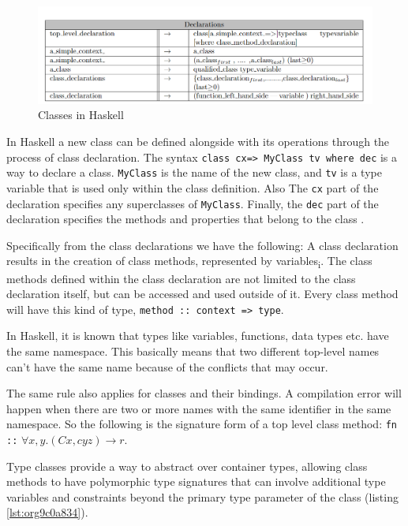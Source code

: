 \documentclass[a4paper, titlepage, twoside]{article}
\begin{document}
\begin{figure}[htbp]
\centering
\includegraphics[width=.9\linewidth]{img/2023-05-25_13-28-35_screenshot.png}
\caption{\label{fig:org0ea80a0}Classes in Haskell}
\end{figure}

In Haskell a new class can be defined alongside with its operations through the process of class declaration. The syntax \texttt{class cx=> MyClass tv where dec} is a way to declare a class. \texttt{MyClass} is the name of the new class, and \texttt{tv} is a type variable that is used only within the class definition. Also The \texttt{cx} part of the declaration specifies any superclasses of \texttt{MyClass}. Finally, the \texttt{dec} part of the declaration specifies the methods and properties that belong to the class \autocite[chapter 4.3]{marlowHaskell2010Language2010}.

Specifically from the class declarations we have the following: A class declaration results in the creation of class methods, represented by variables\textsubscript{i}. The class methods defined within the class declaration are not limited to the class declaration itself, but can be accessed and used outside of it. Every class method will have this kind of type, \texttt{method :: context => type}.

In Haskell, it is known that types like variables, functions, data types etc. have the same namespace. This basically means that two different top-level names can't have the same name because of the conflicts that may occur.

The same rule also applies for classes and their bindings. A compilation error will happen when there are two or more names with the same identifier in the same namespace. So the following is the signature form of a top level class method: \texttt{fn ::} \(\forall x, y. (Cx, cyz) \rightarrow r\).

Type classes provide a way to abstract over container types, allowing class methods to have polymorphic type signatures that can involve additional type variables and constraints beyond the primary type parameter of the class (listing \ref{lst:org9c0a834}).
\end{document}
